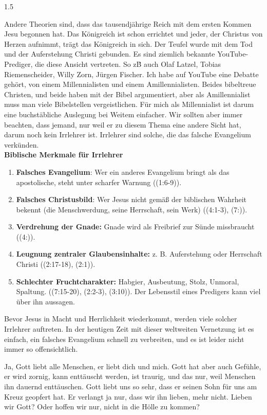 \documentclass[14pt]{../../inc/mybib}
\begin{document}
\begin{spacing}{1.5}
\begin{block}
        Andere Theorien sind, dass das tausendjährige Reich mit dem ersten Kommen Jesu begonnen hat. Das Königreich ist schon errichtet und jeder, der Christus von Herzen aufnimmt, trägt das Königreich in sich. Der Teufel wurde mit dem Tod und der Auferstehung Christi gebunden. Es sind ziemlich bekannte YouTube-Prediger, die diese Ansicht vertreten. So z\.B auch Olaf Latzel, Tobias Riemenscheider, Willy Zorn, Jürgen Fischer.
        Ich habe auf YouTube eine Debatte gehört, von einem Millennialisten und einem Amillennialisten. Beides bibeltreue Christen, und beide haben mit der Bibel argumentiert, aber als Amillennialist muss man viele Bibelstellen vergeistlichen. Für mich als Millennialist ist darum eine buchstäbliche Auslegung bei Weitem einfacher. Wir sollten aber immer beachten, dass jemand, nur weil er zu diesem Thema eine andere Sicht hat, darum noch kein Irrlehrer ist. Irrlehrer sind solche, die das falsche Evangelium verkünden.\\  
        \textbf{Biblische Merkmale für Irrlehrer}
        \begin{enumerate}
            \item \textbf{Falsches Evangelium}: Wer ein anderes Evangelium bringt als das apostolische, steht unter scharfer Warnung ((1:6-9)).
            \item \textbf{Falsches Christusbild}: Wer Jesus nicht gemäß der biblischen Wahrheit bekennt (die Menschwerdung, seine Herrschaft, sein Werk) ((4:1-3), (7:)).
            \item \textbf{Verdrehung der Gnade:} Gnade wird als Freibrief zur Sünde missbraucht ((4:)).
            \item \textbf{Leugnung zentraler Glaubensinhalte:} z. B. Auferstehung oder Herrschaft Christi ((2:17-18), (2:1)).
            \item \textbf{Schlechter Fruchtcharakter:} Habgier, Ausbeutung, Stolz, Unmoral, Spaltung. 
            ((7:15-20), (2:2-3), (3:10)). Der Lebensstil eines Predigers kann viel über ihn aussagen.
        \end{enumerate}        
        Bevor Jesus in Macht und Herrlichkeit wiederkommt, werden viele solcher Irrlehrer auftreten. In der heutigen Zeit mit dieser weltweiten Vernetzung ist es einfach, ein falsches Evangelium schnell zu verbreiten, und es ist leider nicht immer so offensichtlich.

        Ja, Gott liebt alle Menschen, er liebt dich und mich. Gott hat aber auch Gefühle, er wird zornig, kann enttäuscht werden, ist traurig, und das nur, weil Menschen ihn dauernd enttäuschen. Gott liebt uns so sehr, dass er seinen Sohn für uns am Kreuz geopfert hat.  Er verlangt ja nur, dass wir ihn lieben, mehr nicht. Lieben wir Gott? Oder hoffen wir nur, nicht in die Hölle zu kommen?


\end{block}
\end{spacing}
\end{document}
